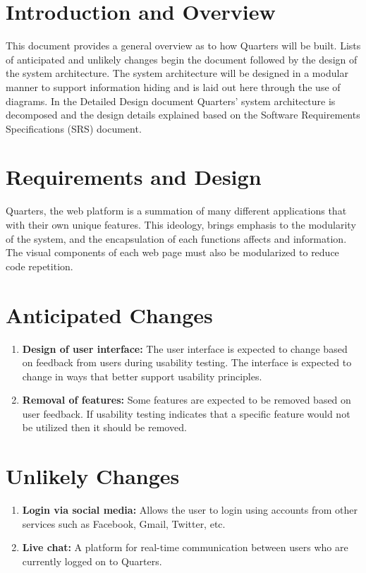 \documentclass[12pt]{article}
\begin{document}
\pagebreak


\section{Introduction and Overview}
This document provides a general overview as to how Quarters will be built. Lists of anticipated and unlikely changes begin the document followed by the design of the system architecture. The system architecture will be designed in a modular manner to support information hiding and is laid out here through the use of diagrams. In the Detailed Design document Quarters' system architecture is decomposed and the design details explained based on the Software Requirements Specifications (SRS) document.

\section{Requirements and Design}
Quarters, the web platform is a summation of many different applications that with their own unique features. This ideology, brings emphasis to the modularity of the system, and the encapsulation of each functions affects and information. The visual components of each web page must also be modularized to reduce code repetition. 

\section{Anticipated Changes}
\begin{enumerate}
  \item \textbf{Design of user interface:} The user interface is expected to change based on feedback from users during usability testing. The interface is expected to change in ways that better support usability principles.
  \item \textbf{Removal of features:} Some features are expected to be removed based on user feedback. If usability testing indicates that a specific feature would not be utilized then it should be removed.
\end{enumerate}

\section{Unlikely Changes}
\begin{enumerate}
  \item \textbf{Login via social media:} Allows the user to login using accounts from other services such as Facebook, Gmail, Twitter, etc.
  \item \textbf{Live chat:} A platform for real-time communication between users who are currently logged on to Quarters.
\end{enumerate}
\end{document}

